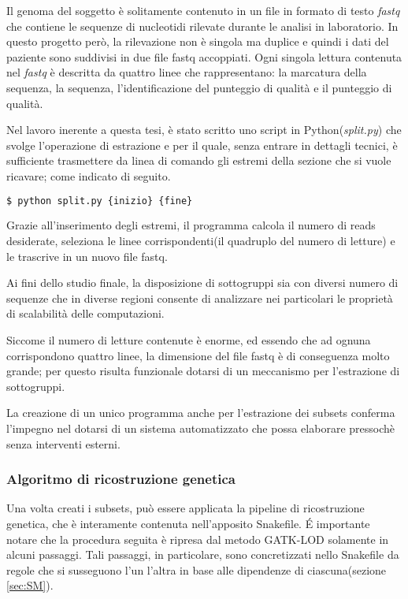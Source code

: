 Il genoma del soggetto è solitamente contenuto in un file in formato di testo \textit{fastq} che contiene le sequenze di nucleotidi rilevate durante le analisi in laboratorio.
In questo progetto però, la rilevazione non è singola ma duplice e quindi i dati del paziente sono suddivisi in due file fastq accoppiati.
Ogni singola lettura contenuta nel \textit{fastq} è descritta da quattro linee che rappresentano: la marcatura della sequenza, la sequenza, l'identificazione del punteggio di qualità e il punteggio di qualità.


Nel lavoro inerente a questa tesi, è stato scritto uno script in Python(\textit{split.py}) che svolge l'operazione di estrazione e per il quale, senza entrare in dettagli tecnici, è sufficiente trasmettere da linea di comando gli estremi della sezione che si vuole ricavare; come indicato di seguito.
\begin{lstlisting}[language=Python]
$ python split.py {inizio} {fine}
\end{lstlisting}
Grazie all'inserimento degli estremi, il programma calcola il numero di reads desiderate, seleziona le linee corrispondenti(il quadruplo del numero di letture) e le trascrive in un nuovo file fastq.

Ai fini dello studio finale, la disposizione di sottogruppi sia con diversi numero di sequenze che in diverse regioni consente di analizzare nei particolari le proprietà di scalabilità delle computazioni.

Siccome il numero di letture contenute è enorme, ed essendo che ad ognuna corrispondono quattro linee, la dimensione del file fastq è di conseguenza molto grande; per questo risulta funzionale dotarsi di un meccanismo per l'estrazione di sottogruppi.

La creazione di un unico programma anche per l'estrazione dei subsets conferma l'impegno nel dotarsi di un sistema automatizzato che possa elaborare pressochè senza interventi esterni.


\subsubsection{Algoritmo di ricostruzione genetica}
Una volta creati i subsets, può essere applicata la pipeline di ricostruzione genetica, che è interamente contenuta nell'apposito Snakefile.
\'E importante notare che la procedura seguita è ripresa dal metodo GATK-LOD solamente in alcuni passaggi.
Tali passaggi, in particolare, sono concretizzati nello Snakefile da regole che si susseguono l'un l'altra in base alle dipendenze di ciascuna(sezione \ref{sec:SM}).


